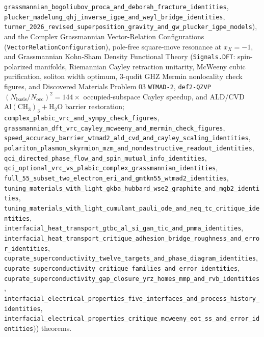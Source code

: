 \texttt{grassmannian\_bogoliubov\_proca\_and\_deborah\_fracture\_identities},
\texttt{plucker\_madelung\_qhj\_inverse\_igpe\_and\_weyl\_bridge\_identities},
\texttt{turner\_2026\_revised\_superposition\_gravity\_and\_gw\_plucker\_igpe\_models}),
and the Complex Grassmannian Vector-Relation Configurations (\texttt{VectorRelationConfiguration}),
pole-free square-move resonance at $x_X=-1$, and Grassmannian Kohn-Sham Density
Functional Theory (\texttt{Signals.DFT}: spin-polarized manifolds, Riemannian Cayley
retraction unitarity, McWeeny cubic purification, soliton width optimum,
3-qudit GHZ Mermin nonlocality check figures, and Discovered Materials Problem 03
\texttt{WTMAD-2}, \texttt{def2-QZVP} $(N_{\mathrm{basis}}/N_{\mathrm{occ}})^2 = 144\times$
occupied-subspace Cayley speedup, and ALD/CVD $\mathrm{Al(CH_3)_3 + H_2O}$ barrier
restoration;
\texttt{complex\_plabic\_vrc\_and\_sympy\_check\_figures},
\texttt{grassmannian\_dft\_vrc\_cayley\_mcweeny\_and\_mermin\_check\_figures},
\texttt{speed\_accuracy\_barrier\_wtmad2\_ald\_cvd\_and\_cayley\_scaling\_identities},
\texttt{polariton\_plasmon\_skyrmion\_mzm\_and\_nondestructive\_readout\_identities},
\texttt{qci\_directed\_phase\_flow\_and\_spin\_mutual\_info\_identities},
\texttt{qci\_optional\_vrc\_vs\_plabic\_complex\_grassmannian\_identities},
\texttt{full\_55\_subset\_two\_electron\_eri\_and\_gmtkn55\_wtmad2\_identities},
\texttt{tuning\_materials\_with\_light\_gkba\_hubbard\_wse2\_graphite\_and\_mgb2\_identities},
\texttt{tuning\_materials\_with\_light\_cumulant\_pauli\_ode\_and\_neq\_tc\_critique\_identities},
\texttt{interfacial\_heat\_transport\_gtbc\_al\_si\_gan\_tic\_and\_pmma\_identities},
\texttt{interfacial\_heat\_transport\_critique\_adhesion\_bridge\_roughness\_and\_error\_identities},
\texttt{cuprate\_superconductivity\_twelve\_targets\_and\_phase\_diagram\_identities},
\texttt{cuprate\_superconductivity\_critique\_families\_and\_error\_identities},
\texttt{cuprate\_superconductivity\_gap\_closure\_yrz\_homes\_mmp\_and\_rvb\_identities},
\texttt{interfacial\_electrical\_properties\_five\_interfaces\_and\_process\_history\_identities},
\texttt{interfacial\_electrical\_properties\_critique\_mcweeny\_eot\_ss\_and\_error\_identities})) theorems.


